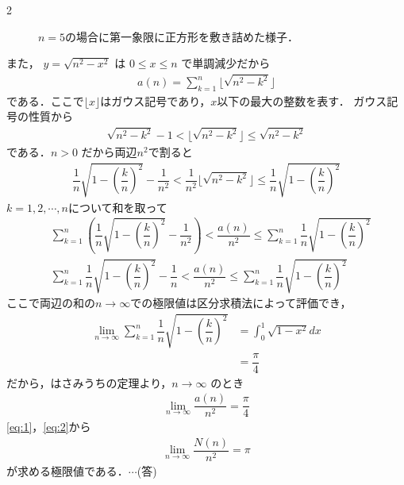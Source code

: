 \documentclass[../../main.tex]{subfiles}
\begin{document}
\begin{multicols}{2}
\begin{figure}[H]
    \caption{$n=5$の場合に第一象限に正方形を敷き詰めた様子．}
    \label{2004-6:fig:1}
  \end{figure}

  また， $y = \sqrt{n^2-x^2}$ は $0 \leq x \leq n$ で単調減少だから
  \begin{align}
    a(n) = \sum_{k=1}^{n} \lfloor\sqrt{n^2-k^2}\rfloor
  \end{align}
  である．ここで$\lfloor x\rfloor$はガウス記号であり，$x$以下の最大の整数を表す．
  ガウス記号の性質から
  \begin{align}
    \sqrt{n^2-k^2} - 1 < \lfloor\sqrt{n^2-k^2}\rfloor \leq \sqrt{n^2-k^2}
  \end{align}
  である．$n>0$ だから両辺$n^2$で割ると
  \begin{align}
    \dfrac{1}{n}\sqrt{1-\left(\dfrac{k}{n}\right)^2} - \dfrac{1}{n^2} < \dfrac{1}{n^2}\lfloor\sqrt{n^2-k^2}\rfloor \leq \dfrac{1}{n}\sqrt{1-\left(\dfrac{k}{n}\right)^2}
  \end{align}
  $k=1,2,\cdots, n$について和を取って
  \begin{align}
    & \sum_{k=1}^{n} \left( \dfrac{1}{n}\sqrt{1-\left(\dfrac{k}{n}\right)^2} - \dfrac{1}{n^2} \right) < \dfrac{a(n)}{n^2} \leq \sum_{k=1}^{n} \dfrac{1}{n}\sqrt{1-\left(\dfrac{k}{n}\right)^2} \\
    & \sum_{k=1}^{n}\dfrac{1}{n}\sqrt{1-\left(\dfrac{k}{n}\right)^2} - \dfrac{1}{n} < \dfrac{a(n)}{n^2} \leq \sum_{k=1}^{n} \dfrac{1}{n}\sqrt{1-\left(\dfrac{k}{n}\right)^2}
  \end{align}
  ここで両辺の和の$n\to\infty$での極限値は区分求積法によって評価でき，
  \begin{align}
    \lim_{n \to \infty} \sum_{k=1}^{n} \dfrac{1}{n}\sqrt{1-\left(\dfrac{k}{n}\right)^2}
    & =\int_{0}^{1} \sqrt{1-x^2} dx \\
    & = \dfrac{\pi}{4}
  \end{align}
  だから，はさみうちの定理より，$n \to \infty$ のとき
  \begin{align}
    \lim_{n\to\infty}\dfrac{a(n)}{n^2} = \dfrac{\pi}{4} \label{eq:2}
  \end{align}
  \cref{eq:1}，\cref{eq:2}から
  \begin{align}
    \lim_{n\to\infty}\dfrac{N(n)}{n^2} = \pi
  \end{align}
  が求める極限値である．$\cdots$(答)


\end{multicols}
\end{document}
